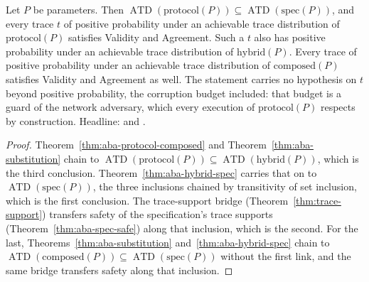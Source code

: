 \begin{theorem}
  \label{thm:aba-protocol}
  \leanok
  Let $P$ be parameters.
  Then $\operatorname{ATD}(\mathrm{protocol}(P)) \subseteq \operatorname{ATD}(\mathrm{spec}(P))$, and every trace $t$ of positive probability under an achievable trace distribution of $\mathrm{protocol}(P)$ satisfies Validity and Agreement.
  Such a $t$ also has positive probability under an achievable trace distribution of $\mathrm{hybrid}(P)$.
  Every trace of positive probability under an achievable trace distribution of $\mathrm{composed}(P)$ satisfies Validity and Agreement as well.
  The statement carries no hypothesis on $t$ beyond positive probability, the corruption budget included: that budget is a guard of the network adversary, which every execution of $\mathrm{protocol}(P)$ respects by construction.
  Headline:  and .
\end{theorem}

\begin{proof}\leanok
  Theorem~\ref{thm:aba-protocol-composed} and Theorem~\ref{thm:aba-substitution} chain to $\operatorname{ATD}(\mathrm{protocol}(P)) \subseteq \operatorname{ATD}(\mathrm{hybrid}(P))$, which is the third conclusion.
  Theorem~\ref{thm:aba-hybrid-spec} carries that on to $\operatorname{ATD}(\mathrm{spec}(P))$, the three inclusions chained by transitivity of set inclusion, which is the first conclusion.
  The trace-support bridge (Theorem~\ref{thm:trace-support}) transfers safety of the specification's trace supports (Theorem~\ref{thm:aba-spec-safe}) along that inclusion, which is the second.
  For the last, Theorems~\ref{thm:aba-substitution} and~\ref{thm:aba-hybrid-spec} chain to $\operatorname{ATD}(\mathrm{composed}(P)) \subseteq \operatorname{ATD}(\mathrm{spec}(P))$ without the first link, and the same bridge transfers safety along that inclusion.
\end{proof}
